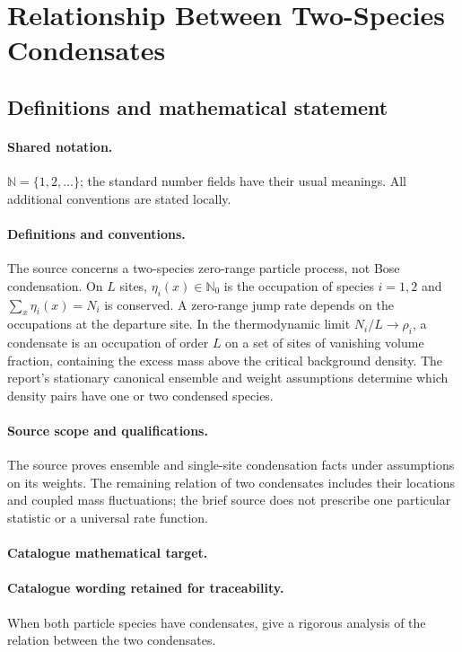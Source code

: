 \documentclass[11pt]{article}
\begin{document}
\section{Relationship Between Two-Species Condensates}\label{statement}

\subsection{Definitions and mathematical statement}

\paragraph{Shared notation.}$\mathbb N=\{1,2,\ldots\}$; the standard number fields have their usual meanings. All additional conventions are stated locally.


\paragraph{Definitions and conventions.} The source concerns a two-species zero-range particle process, not Bose condensation. On $L$ sites, $\eta_i(x)\in\mathbb N_0$ is the occupation of species $i=1,2$ and $\sum_x\eta_i(x)=N_i$ is conserved. A zero-range jump rate depends on the occupations at the departure site. In the thermodynamic limit $N_i/L\to\rho_i$, a condensate is an occupation of order $L$ on a set of sites of vanishing volume fraction, containing the excess mass above the critical background density. The report's stationary canonical ensemble and weight assumptions determine which density pairs have one or two condensed species.

\paragraph{Source scope and qualifications.} The source proves ensemble and single-site condensation facts under assumptions on its weights. The remaining relation of two condensates includes their locations and coupled mass fluctuations; the brief source does not prescribe one particular statistic or a universal rate function.

\paragraph{Catalogue mathematical target.}
\paragraph{Catalogue wording retained for traceability.}
When both particle species have condensates, give a rigorous analysis of the relation between the two condensates.
\end{document}
